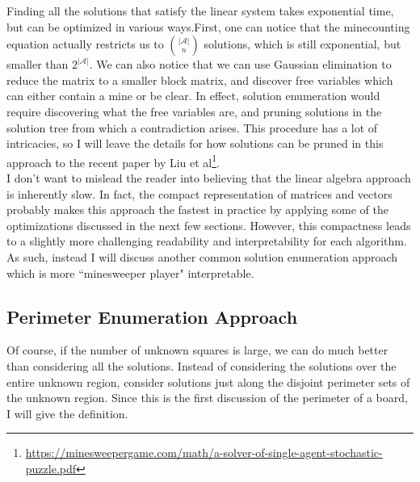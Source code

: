 Finding all the solutions that satisfy the linear system takes exponential time, but can be optimized in various ways.First, one can notice that the minecounting equation actually restricts us to $|\mathcal{A}|\choose n$ solutions, which is still exponential, but smaller than $2^{|\mathcal{A}|}$. We can also notice that we can use Gaussian elimination to reduce the matrix to a smaller block matrix, and discover free variables which can either contain a mine or be clear. In effect, solution enumeration would require discovering what the free variables are, and pruning solutions in the solution tree from which a contradiction arises. This procedure has a lot of intricacies, so I will leave the details for how solutions can be pruned in this approach to the recent paper by Liu et al\footnote{\url{https://minesweepergame.com/math/a-solver-of-single-agent-stochastic-puzzle.pdf}}.\\

I don't want to mislead the reader into believing that the linear algebra approach is inherently slow. In fact, the compact representation of matrices and vectors probably makes this approach the fastest in practice by applying some of the optimizations discussed in the next few sections. However, this compactness leads to a slightly more challenging readability and interpretability for each algorithm. As such, instead I will discuss another common solution enumeration approach which is more ``minesweeper player" interpretable.\\

\subsection{Perimeter Enumeration Approach}

Of course, if the number of unknown squares is large, we can do much better than considering all the solutions. Instead of considering the solutions over the entire unknown region, consider solutions just along the disjoint perimeter sets of the unknown region. Since this is the first discussion of the perimeter of a board, I will give the definition.\\


